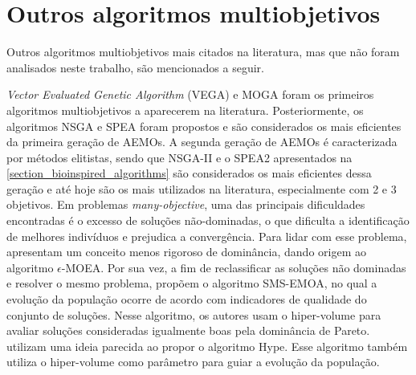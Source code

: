 \section{Outros algoritmos multiobjetivos}
Outros algoritmos multiobjetivos mais citados na literatura, mas que não foram analisados neste trabalho, são mencionados a seguir.

\textit{Vector Evaluated Genetic Algorithm} (VEGA) \cite{Schaffer1985} e \ac{MOGA} \cite{MOGA} foram os primeiros algoritmos multiobjetivos a aparecerem na literatura. Posteriormente, os algoritmos \ac{NSGA} \cite{Srinivas1994} e \ac{SPEA} \cite{Zitzler1999} foram propostos e são considerados os mais eficientes da primeira geração de \acp{AEMO}. A segunda geração de \acp{AEMO} é caracterizada por métodos elitistas, sendo que NSGA-II e o SPEA2 apresentados na \ref{section_bioinspired_algorithms} são considerados os mais eficientes dessa geração e até hoje são os mais utilizados na literatura, especialmente com 2 e 3 objetivos. Em problemas \textit{many-objective}, uma das principais dificuldades encontradas é o excesso de soluções não-dominadas, o que dificulta a identificação de melhores indivíduos e prejudica a convergência. Para lidar com esse problema,  apresentam um conceito menos rigoroso de dominância, dando origem ao algoritmo $\epsilon$-MOEA. Por sua vez, a fim de reclassificar as soluções não dominadas e resolver o mesmo problema,  propõem o algoritmo SMS-EMOA, no qual a evolução da população ocorre de acordo com indicadores de qualidade do conjunto de soluções. Nesse algoritmo, os autores usam o hiper-volume para avaliar soluções consideradas igualmente boas pela dominância de Pareto.  utilizam uma ideia parecida ao propor o algoritmo Hype. Esse algoritmo também utiliza o hiper-volume como parâmetro para guiar a evolução da população. 

